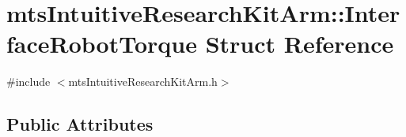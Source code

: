 \hypertarget{structmts_intuitive_research_kit_arm_1_1_interface_robot_torque}{\section{mts\-Intuitive\-Research\-Kit\-Arm\-:\-:Interface\-Robot\-Torque Struct Reference}
\label{structmts_intuitive_research_kit_arm_1_1_interface_robot_torque}
}


{\ttfamily \#include $<$mts\-Intuitive\-Research\-Kit\-Arm.\-h$>$}

\subsection*{Public Attributes}
